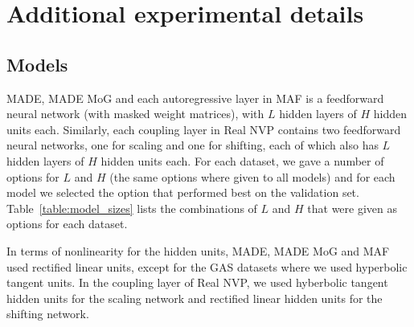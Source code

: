 \section{Additional experimental details}
\label{sec:experimental_details}

\subsection{Models}

MADE, MADE MoG and each autoregressive layer in MAF is a feedforward neural network (with masked weight matrices), with $L$ hidden layers of $H$ hidden units each. Similarly, each coupling layer in Real NVP contains two feedforward neural networks, one for scaling and one for shifting, each of which also has $L$ hidden layers of $H$ hidden units each. For each dataset, we gave a number of options for $L$ and $H$ (the same options where given to all models) and for each model we selected the option that performed best on the validation set. Table~\ref{table:model_sizes} lists the combinations of $L$ and $H$ that were given as options for each dataset.

In terms of nonlinearity for the hidden units, MADE, MADE MoG and MAF used rectified linear units, except for the GAS datasets where we used hyperbolic tangent units. In the coupling layer of Real NVP, we used hyberbolic tangent hidden units for the scaling network and rectified linear hidden units for the shifting network.


